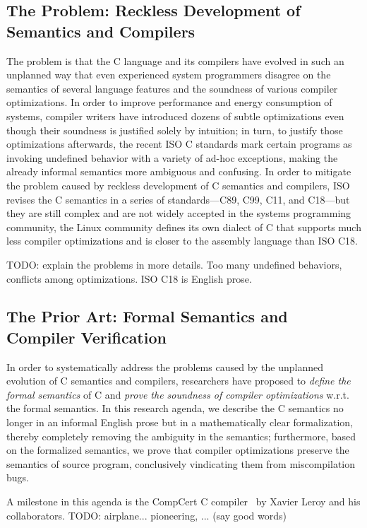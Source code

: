 \subsection{The Problem: Reckless Development of Semantics and Compilers}

The problem is that the C language and its compilers have evolved in such an unplanned way that even
experienced system programmers disagree on the semantics of several language features and the
soundness of various compiler optimizations.  In order to improve performance and energy consumption
of systems, compiler writers have introduced dozens of subtle optimizations even though their
soundness is justified solely by intuition; in turn, to justify those optimizations afterwards, the
recent ISO C standards mark certain programs as invoking undefined behavior with a variety of ad-hoc
exceptions, making the already informal semantics more ambiguous and confusing.  In order to
mitigate the problem caused by reckless development of C semantics and compilers, ISO revises the C
semantics in a series of standards---C89, C99, C11, and C18---but they are still complex and are not
widely accepted in the systems programming community, \eg{} the Linux community defines its own
dialect of C that supports much less compiler optimizations and is closer to the assembly language
than ISO C18.

TODO: explain the problems in more details.  Too many undefined behaviors, conflicts among
optimizations.  ISO C18 is English prose.


\subsection{The Prior Art: Formal Semantics and Compiler Verification}

In order to systematically address the problems caused by the unplanned evolution of C semantics and
compilers, researchers have proposed to \emph{define the formal semantics} of C and \emph{prove the
  soundness of compiler optimizations} w.r.t. the formal semantics.  In this research agenda, we
describe the C semantics no longer in an informal English prose but in a mathematically clear
formalization, thereby completely removing the ambiguity in the semantics; furthermore, based on the
formalized semantics, we prove that compiler optimizations preserve the semantics of source program,
conclusively vindicating them from miscompilation bugs.

A milestone in this agenda is the CompCert C compiler~\cite{compcert} by Xavier Leroy and his
collaborators.  TODO: airplane...  pioneering, ... (say good words)

